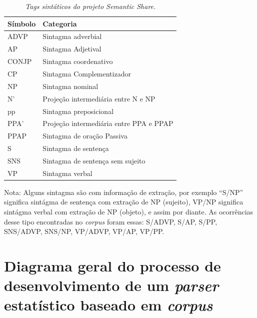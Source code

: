 \begin{table}

   \centering
   \small
   \caption{\it Tags sintáticos do projeto Semantic Share.}

    \begin{tabular}{ | p{3cm} | p{10cm} | }
      \hline
        \textbf{Símbolo} & \textbf{Categoria}\\
        \hline
        \hline

        ADVP& Sintagma adverbial \\
        \hline
        AP& Sintagma Adjetival\\
        \hline
        CONJP&Sintagma coordenativo\\
        \hline
        CP&Sintagma Complementizador\\
        \hline
        NP&Sintagma nominal\\
        \hline
        N'&Projeção intermediária entre N e NP\\
        \hline
        pp&Sintagma preposicional\\
        \hline
        PPA'&Projeção intermediária entre PPA e PPAP\\
        \hline
        PPAP&Sintagma de oração Passiva\\
        \hline
        S&Sintagma de sentença\\
        \hline
        SNS&Sintagma de sentença sem sujeito\\
        \hline
        VP&Sintagma verbal\\
        \hline

   \end{tabular}
   \label{tbl:semantic_share_cats}

\end{table}

Nota: Alguns sintagma são com informação de extração, por exemplo ``S/NP'' significa sintágma de sentença com extração de NP (sujeito), VP/NP significa sintágma verbal com extração de NP (objeto), e assim por diante. As ocorrências desse tipo encontradas no \emph{corpus} foram essas: S/ADVP, S/AP, S/PP, SNS/ADVP, SNS/NP, VP/ADVP, VP/AP, VP/PP.

\newpage

\section{Diagrama geral do processo de desenvolvimento de um \emph{parser} estatístico baseado em \emph{corpus}} %
\label{sec:diagrama_geral_do_processo_de_parsing_estatistico_baseado_em_corpus}

